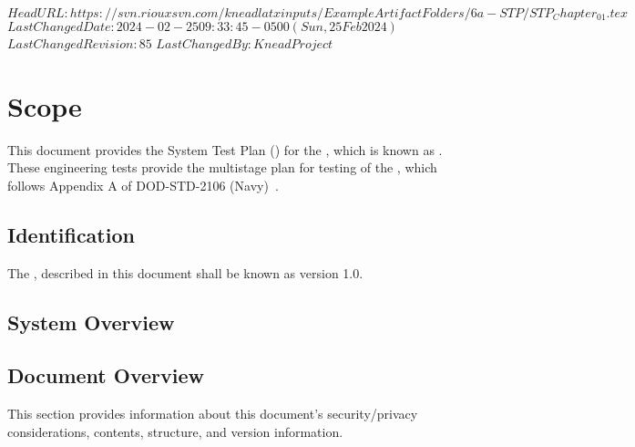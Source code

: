 \svnidlong
{$HeadURL: https://svn.riouxsvn.com/kneadlatxinputs/ExampleArtifactFolders/6a-STP/STP_Chapter_01.tex $}
{$LastChangedDate: 2024-02-25 09:33:45 -0500 (Sun, 25 Feb 2024) $}
{$LastChangedRevision: 85 $}
{$LastChangedBy: KneadProject $}

\chapter{Scope}
\label{loc:Scope}


This document provides the System Test Plan (\STP) for the \ThisSystem, which is known as \ThisSys.
These engineering tests provide the multistage plan for testing of the \ThisSys, which follows Appendix A of DOD-STD-2106 (Navy)~\cite{ref__DOD_STD_2106_NAVY}.


\section{Identification}


The \ThisSys, described in this document shall be known as \ThisSys version 1.0.


\section{System Overview}
\label{loc:SystemOverview}





\section{Document Overview}
\label{loc:DocumentOverview}


This section provides information about this document's security/privacy considerations, contents, structure, and version information.








